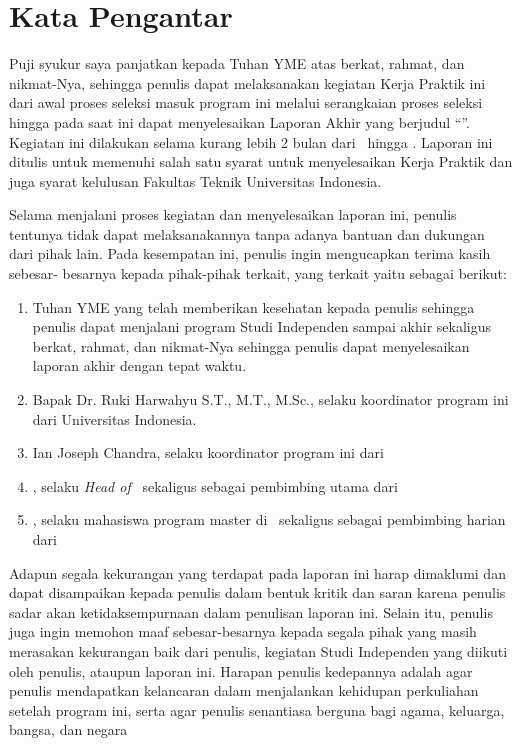 \chapter*{Kata Pengantar}

Puji syukur saya panjatkan kepada Tuhan YME atas berkat, rahmat, dan
nikmat-Nya, sehingga penulis dapat melaksanakan kegiatan Kerja Praktik ini dari
awal proses seleksi masuk program ini melalui serangkaian proses seleksi hingga
pada saat ini dapat menyelesaikan Laporan Akhir yang berjudul “\judul”. Kegiatan ini dilakukan selama
kurang lebih 2 bulan dari \startMagang \ hingga \akhirMagang. Laporan ini ditulis
untuk memenuhi salah satu syarat untuk menyelesaikan Kerja Praktik dan juga
syarat kelulusan Fakultas Teknik Universitas Indonesia.

Selama menjalani proses kegiatan dan menyelesaikan laporan ini, penulis
tentunya tidak dapat melaksanakannya tanpa adanya bantuan dan dukungan dari
pihak lain. Pada kesempatan ini, penulis ingin mengucapkan terima kasih sebesar-
besarnya kepada pihak-pihak terkait, yang terkait yaitu sebagai berikut:

\begin{enumerate}
	\item Tuhan YME yang telah memberikan kesehatan kepada penulis sehingga
        penulis dapat menjalani program Studi Independen sampai akhir
        sekaligus berkat, rahmat, dan nikmat-Nya sehingga penulis dapat
        menyelesaikan laporan akhir dengan tepat waktu.
	\item Bapak Dr. Ruki Harwahyu S.T., M.T., M.Sc., selaku koordinator
        program ini dari Universitas Indonesia.
	\item Ian Joseph Chandra, selaku koordinator program ini dari \namaUniv
	\item \pembimbingUtama, selaku 
        \textit{Head of }\namaLab \ sekaligus sebagai pembimbing utama dari \namaUniv
	\item \pembimbingHarian, selaku mahasiswa program master di \namaLab \ sekaligus sebagai pembimbing harian dari \namaUniv
\end{enumerate}

Adapun segala kekurangan yang terdapat pada laporan ini harap dimaklumi
dan dapat disampaikan kepada penulis dalam bentuk kritik dan saran karena penulis
sadar akan ketidaksempurnaan dalam penulisan laporan ini. Selain itu, penulis juga
ingin memohon maaf sebesar-besarnya kepada segala pihak yang masih merasakan
kekurangan baik dari penulis, kegiatan Studi Independen yang diikuti oleh penulis,
ataupun laporan ini. Harapan penulis kedepannya adalah agar penulis mendapatkan
kelancaran dalam menjalankan kehidupan perkuliahan setelah program ini, serta
agar penulis senantiasa berguna bagi agama, keluarga, bangsa, dan negara

